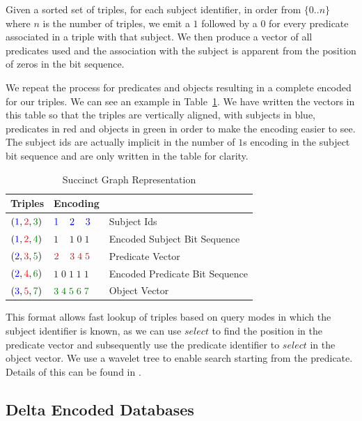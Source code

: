 \documentclass[10pt, a4paper, twocolumn]{article} %
\newcommand{\s}[1]{\textcolor{Blue}{#1}}
\newcommand{\p}[1]{\textcolor{Red}{#1}}
\newcommand{\w}[1]{\textcolor{Green}{#1}}
\begin{document}
Given a sorted set of triples, for each subject identifier, in order
from \(\{0..n\}\) where \(n\) is the number of triples, we emit a
\(1\) followed by a \(0\) for every predicate associated in a triple
with that subject. We then produce a vector of all predicates used and
the association with the subject is apparent from the position of
zeros in the bit sequence.

We repeat the process for predicates and objects resulting in a
complete encoded for our triples. We can see an example in
Table~\ref{tab:graph}.  We have written the vectors in this table so
that the triples are vertically aligned, with subjects in blue,
predicates in red and objects in green in order to make the encoding
easier to see. The subject ids are actually implicit in the number of
\(1\)s encoding in the subject bit sequence and are only written in
the table for clarity.

\begin{table}
	\centering
	\begin{tabular}{l|l|l}
		\toprule
		Triples & Encoding & \\
		\midrule
        \(  (\s{1},\p{2},\w{3}) \)  & \(\s{1}\;\;\;\;\s{2} \;\;\;\;\s{3}\) & Subject Ids \\
        \(  (\s{1},\p{2},\w{4}) \)  & \(   1\;\;\;\;    1\;    0\;    1\) & Encoded Subject Bit Sequence\\
        \(  (\s{2},\p{3},\w{5}) \)  & \(\p{2}\;\;\;\;\p{3}\;\p{4}\;\p{5}\) & Predicate Vector \\
	    \(  (\s{2},\p{4},\w{6}) \)  & \(   1\;   0\;    1\;    1\;    1\) & Encoded Predicate Bit Sequence\\
	    \(  (\s{3},\p{5},\w{7}) \)  & \(\w{3}\;\w{4}\;\w{5}\;\w{6}\;\w{7}\) & Object Vector \\
		\bottomrule
	\end{tabular}
    \caption{Succinct Graph Representation}
    \label{tab:graph}
\end{table}

This format allows fast lookup of triples based on query modes in
which the subject identifier is known, as we can use \(select\) to
find the position in the predicate vector and subsequently use the
predicate identifier to \(select\) in the object vector. We use a
wavelet tree to enable search starting from the predicate. Details of
this can be found in \cite{10.1007/978-3-642-30284-8_36}.

\subsection{Delta Encoded Databases}
\end{document}
